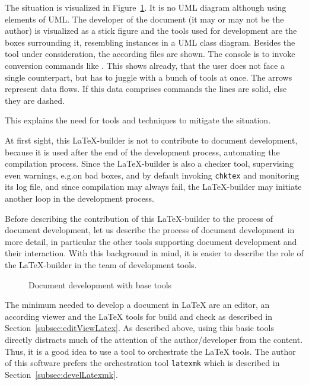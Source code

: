 The situation is visualized in Figure~\ref{fig:docDevelBase}. 
It is no UML diagram although using elements of UML\@. 
The developer of the document (it may or may not be the author) 
is visualized as a stick figure 
and the tools used for development are the boxes surrounding it,
resembling instances in a UML class diagram. 
Besides the tool under consideration, the according files are shown. 
The console is to invoke conversion commands like \lualatex. 
This shows already, that the user does not face a single counterpart, 
but has to juggle with a bunch of tools at once. 
The arrows represent data flows. 
If this data comprises commands the lines are solid, else they are dashed. 

This explains the need for tools and techniques to mitigate the situation. 

At first sight, this \LaTeX-builder is not to contribute to document development, 
because it is used after the end of the development process, 
automating the compilation process. 
Since the \LaTeX-builder is also a checker tool, 
supervising even warnings, e.g.\@ on bad boxes, and by default invoking \texttt{chktex} 
and monitoring its log file, and since compilation may always fail, 
the \LaTeX-builder may initiate another loop in the development process. 

Before describing the contribution of this \LaTeX-builder 
to the process of document development, 
let us describe the process of document development in more detail, 
in particular the other tools supporting document development and their interaction. 
With this background in mind, it is easier to describe the role of the \LaTeX-builder 
in the team of development tools. 

\begin{figure}
  \centering
  \caption{\label{fig:docDevelBase}Document development with base tools}
\end{figure}

The minimum needed to develop a document in \LaTeX{} 
are an editor, an according viewer and the \LaTeX{} tools for build and check 
as described in Section~\ref{subsec:editViewLatex}. 
As described above, using this basic tools directly 
distracts much of the attention of the author/developer 
from the content. 
Thus, it is a good idea to use a tool to orchestrate the \LaTeX{} tools. 
The author of this software prefers the orchestration tool \texttt{latexmk} 
which is described in Section~\ref{subsec:develLatexmk}. 

